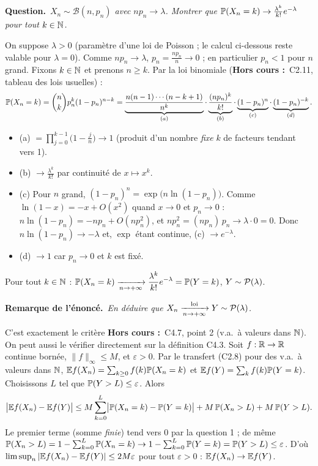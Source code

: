 \documentclass[11pt,a4paper]{article}
\newcommand{\hc}{\textbf{Hors cours :}~}
\newcommand{\Bin}{\mathcal{B}}
\begin{document}
\begin{exo}

\par\medskip\noindent\textbf{Question.}~\emph{$X_n\sim\Bin(n,p_n)$ avec $np_n\to\lambda$. Montrer que $\mathbb{P}(X_n=k)\to\frac{\lambda^k}{k!}e^{-\lambda}$ pour tout $k\in\mathbb{N}$.}

On suppose $\lambda>0$ (paramètre d'une loi de Poisson ; le calcul ci-dessous reste valable pour $\lambda=0$). Comme $np_n\to\lambda$,
$p_n=\frac{np_n}n\to0$ ; en particulier $p_n<1$ pour $n$ grand. Fixons $k\in\mathbb{N}$ et prenons $n\ge k$. Par la loi binomiale (\hc C2.11, tableau
des lois usuelles) :
\[\mathbb{P}(X_n=k)=\binom nkp_n^k(1-p_n)^{n-k}
=\underbrace{\frac{n(n-1)\cdots(n-k+1)}{n^k}}_{(a)}\cdot\underbrace{\frac{(np_n)^k}{k!}}_{(b)}\cdot\underbrace{(1-p_n)^n}_{(c)}\cdot\underbrace{(1-p_n)^{-k}}_{(d)} .\]
\begin{itemize}
  \item (a) $=\prod_{j=0}^{k-1}\bigl(1-\frac jn\bigr)\to1$ (produit d'un nombre \emph{fixe} $k$ de facteurs tendant vers 1).
  \item (b) $\to\frac{\lambda^k}{k!}$ par continuité de $x\mapsto x^k$.
  \item (c) Pour $n$ grand, $(1-p_n)^n=\exp\bigl(n\ln(1-p_n)\bigr)$. Comme $\ln(1-x)=-x+O(x^2)$ quand $x\to0$ et $p_n\to0$ :
  $n\ln(1-p_n)=-np_n+O(np_n^2)$, et $np_n^2=(np_n)\,p_n\to\lambda\cdot0=0$. Donc $n\ln(1-p_n)\to-\lambda$ et, $\exp$ étant continue,
  (c) $\to e^{-\lambda}$.
  \item (d) $\to1$ car $p_n\to0$ et $k$ est fixé.
\end{itemize}
\begin{resultat}
Pour tout $k\in\mathbb{N}$ : $\displaystyle\mathbb{P}(X_n=k)\xrightarrow[n\to+\infty]{}\frac{\lambda^k}{k!}e^{-\lambda}=\mathbb{P}(Y=k)$, $Y\sim\mathcal{P}(\lambda)$.
\end{resultat}

\par\medskip\noindent\textbf{Remarque de l'énoncé.}~\emph{En déduire que $X_n\xrightarrow[n\to+\infty]{\text{loi}} Y\sim\mathcal{P}(\lambda)$.}

C'est exactement le critère \hc C4.7, point 2 (v.a.\ à valeurs dans $\mathbb{N}$). On peut aussi le vérifier directement sur la définition C4.3.
Soit $f:\mathbb{R}\to\mathbb{R}$ continue bornée, $\|f\|_\infty\le M$, et $\varepsilon>0$. Par le transfert (C2.8) pour des v.a.\ à valeurs dans $\mathbb{N}$,
$\mathbb{E} f(X_n)=\sum_{k\ge0}f(k)\mathbb{P}(X_n=k)$ et $\mathbb{E} f(Y)=\sum_kf(k)\mathbb{P}(Y=k)$. Choisissons $L$ tel que $\mathbb{P}(Y>L)\le\varepsilon$. Alors
\[\bigl|\mathbb{E} f(X_n)-\mathbb{E} f(Y)\bigr|\le M\sum_{k=0}^L\bigl|\mathbb{P}(X_n=k)-\mathbb{P}(Y=k)\bigr|+M\,\mathbb{P}(X_n>L)+M\,\mathbb{P}(Y>L).\]
Le premier terme (somme \emph{finie}) tend vers 0 par la question 1 ; de même
$\mathbb{P}(X_n>L)=1-\sum_{k=0}^L\mathbb{P}(X_n=k)\to1-\sum_{k=0}^L\mathbb{P}(Y=k)=\mathbb{P}(Y>L)\le\varepsilon$. D'où $\limsup_n|\mathbb{E} f(X_n)-\mathbb{E} f(Y)|\le2M\varepsilon$
pour tout $\varepsilon>0$ : $\mathbb{E} f(X_n)\to\mathbb{E} f(Y)$.


\end{exo}
\end{document}
